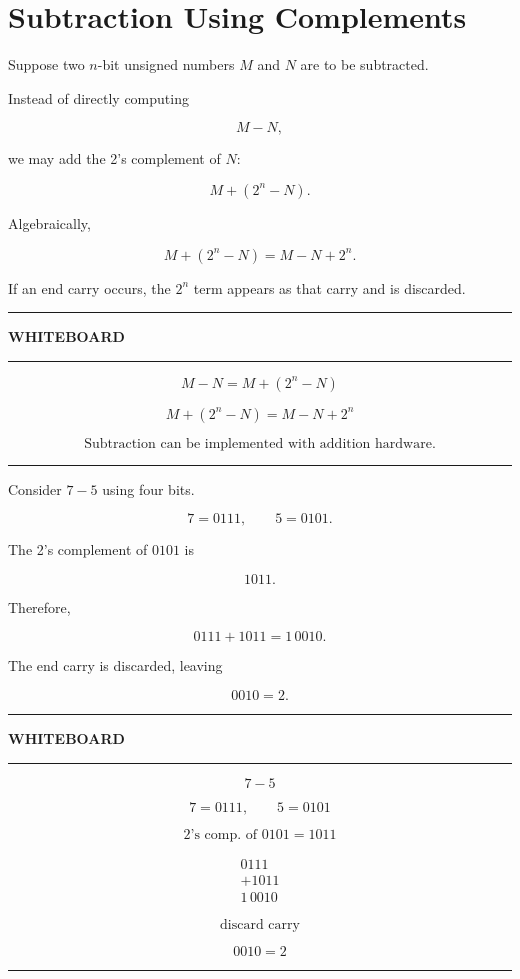 \documentclass[11pt]{article}
\newenvironment{whiteboard}
{
    \par\medskip
    \begin{center}
    \begin{minipage}{0.94\textwidth}
    \hrule
    \vspace{0.4em}
    \textbf{\large WHITEBOARD}
    \vspace{0.3em}
    \hrule
    \vspace{0.7em}
}
{
    \vspace{0.5em}
    \hrule
    \end{minipage}
    \end{center}
    \medskip
}
\begin{document}
\section{Subtraction Using Complements}

Suppose two \(n\)-bit unsigned numbers \(M\) and \(N\) are to be subtracted.

Instead of directly computing

\[
M-N,
\]

we may add the 2's complement of \(N\):

\[
M+(2^n-N).
\]

Algebraically,

\[
M+(2^n-N)=M-N+2^n.
\]

If an end carry occurs, the \(2^n\) term appears as that carry and is discarded.

\begin{whiteboard}
\[
\boxed{M-N=M+(2^n-N)}
\]

\[
M+(2^n-N)=M-N+2^n
\]

\[
\boxed{\text{Subtraction can be implemented with addition hardware.}}
\]
\end{whiteboard}

Consider \(7-5\) using four bits.

\[
7=0111,
\qquad
5=0101.
\]

The 2's complement of \(0101\) is

\[
1011.
\]

Therefore,

\[
0111+1011=1\,0010.
\]

The end carry is discarded, leaving

\[
0010=2.
\]

\begin{whiteboard}
\[
7-5
\]

\[
7=0111,\qquad5=0101
\]

\[
\text{2's comp. of }0101=1011
\]

\[
\begin{array}{r}
0111\\
+1011\\ \hline
1\,0010
\end{array}
\]

\[
\text{discard carry}
\]

\[
\boxed{0010=2}
\]
\end{whiteboard}

\end{document}
